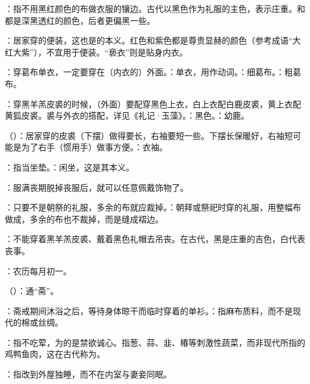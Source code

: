 {
\item {}：指不用黑红颜色的布做衣服的镶边。古代以黑色作为礼服的主色，表示庄重。和都是深黑透红的颜色，后者更偏黑一些。
\item {}：居家穿的便装，这也是的本义。红色和紫色都是尊贵显赫的颜色（参考成语“大红大紫”），不宜用于便装。“亵衣”则是贴身内衣。
\item {}：穿葛布单衣，一定要穿在（内衣的）外面。：单衣，用作动词。：细葛布。：粗葛布。
\item {}：穿黑羊羔皮裘的时候，（外面）要配穿黑色上衣，白上衣配白鹿皮裘，黄上衣配黄狐皮裘。裘与外衣的搭配，详见《礼记·玉藻》。：黑色。：幼鹿。
\item {}（）：居家穿的皮裘（下摆）做得要长，右袖要短一些。下摆长保暖好，右袖短可能是为了右手（惯用手）做事方便。：衣袖。
\item {}：指当坐垫。：闲坐，这是其本义。
\item {}：服满丧期脱掉丧服后，就可以任意佩戴饰物了。
\item {}：只要不是朝祭的礼服，多余的布就应裁掉。：朝拜或祭祀时穿的礼服，用整幅布做成，多余的布也不裁掉，而是缝成褶边。
\item {}：不能穿着黑羊羔皮裘、戴着黑色礼帽去吊丧。在古代，黑是庄重的吉色，白代表丧事。
\item {}：农历每月初一。
}
{}


{
\item {}（）：通“斋”。
\item {}：斋戒期间沐浴之后，等待身体晾干而临时穿着的单衫。：指麻布质料，而不是现代的棉或丝绸。
\item {}：指不吃荤，为的是禁欲诚心。指葱、蒜、韭、椿等刺激性蔬菜，而非现代所指的鸡鸭鱼肉，这在古代称为。%
\item {}：指改到外屋独睡，而不在内室与妻妾同眠。
}
{}


